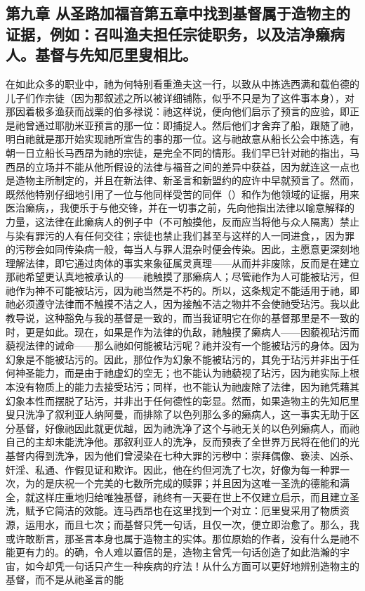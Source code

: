 \subsection{第九章 从圣路加福音第五章中找到基督属于造物主的证据，例如：召叫渔夫担任宗徒职务，以及洁净癞病人。基督与先知厄里叟相比。}

在如此众多的职业中，祂为何特别看重渔夫这一行，以致从中拣选西满和载伯德的儿子们作宗徒（因为那叙述之所以被详细铺陈，似乎不只是为了这件事本身），对那因着极多渔获而战栗的伯多禄说：祂这样说，便向他们启示了预言的应验，即正是祂曾通过耶肋米亚预言的那一位：即捕捉人。然后他们才舍弃了船，跟随了祂，明白祂就是那开始实现祂所宣告的事的那一位。这与祂故意从船长公会中拣选，有朝一日立船长马西昂为祂的宗徒，是完全不同的情形。我们早已针对祂的指出，马西昂的立场并不能从他所假设的法律与福音之间的差异中获益，因为就连这一点也是造物主所制定的，并且在新法律、新圣言和新盟约的应许中早就预言了。然而，既然他特别仔细地引用了一位与他同样受苦的同伴（）和作为他领域的证据，用来医治癞病，，我便乐于与他交锋，并在一切事之前，先向他指出法律以喻意解释的力量，这法律在此癞病人的例子中（不可触摸他，反而应当将他与众人隔离）禁止与染有罪污的人有任何交往；宗徒也禁止我们甚至与这样的人一同进食，，因为罪的污秽会如同传染病一般，每当人与罪人混杂时便会传染。因此，主愿意更深刻地理解法律，即它通过肉体的事实来象征属灵真理——从而并非废除，反而是在建立那祂希望更认真地被承认的——祂触摸了那癞病人；尽管祂作为人可能被玷污，但祂作为神不可能被玷污，因为祂当然是不朽的。所以，这条规定不能适用于祂，即祂必须遵守法律而不触摸不洁之人，因为接触不洁之物并不会使祂受玷污。我以此教导说，这种豁免与我的基督是一致的，而当我证明它在你的基督那里是不一致的时，更是如此。现在，如果是作为法律的仇敌，祂触摸了癞病人——因藐视玷污而藐视法律的诫命——那么祂如何能被玷污呢？祂并没有一个能被玷污的身体。因为幻象是不能被玷污的。因此，那位作为幻象不能被玷污的，其免于玷污并非出于任何神圣能力，而是由于祂虚幻的空无；也不能认为祂藐视了玷污，因为祂实际上根本没有物质上的能力去接受玷污；同样，也不能认为祂废除了法律，因为祂凭藉其幻象本性而摆脱了玷污，并非出于任何德性的彰显。然而，如果造物主的先知厄里叟只洗净了叙利亚人纳阿曼，而排除了以色列那么多的癞病人，这一事实无助于区分基督，好像祂因此就更优越，因为祂洗净了这个与祂无关的以色列癞病人，而祂自己的主却未能洗净他。那叙利亚人的洗净，反而预表了全世界万民将在他们的光基督内得到洗净，因为他们曾浸染在七种大罪的污秽中：崇拜偶像、亵渎、凶杀、奸淫、私通、作假见证和欺诈。因此，他在约但河洗了七次，好像为每一种罪一次，为的是庆祝一个完美的七数所完成的赎罪；并且因为这唯一圣洗的德能和满全，就这样庄重地归给唯独基督，祂终有一天要在世上不仅建立启示，而且建立圣洗，赋予它简洁的效能。连马西昂也在这里找到一个对立：厄里叟采用了物质资源，运用水，而且七次；而基督只凭一句话，且仅一次，便立即治愈了。那么，我或许敢断言，那圣言本身也属于造物主的实体。那位原始的作者，没有什么是祂不能更有力的。的确，令人难以置信的是，造物主曾凭一句话创造了如此浩瀚的宇宙，如今却凭一句话只产生一种疾病的疗法！从什么方面可以更好地辨别造物主的基督，而不是从祂圣言的能